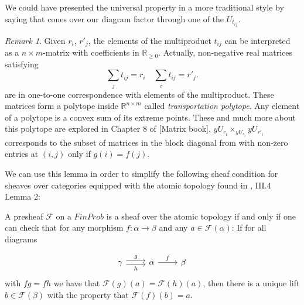 \documentclass[a4paper]{amsproc}
\theoremstyle{plain}
\theoremstyle{definition}
\theoremstyle{remark}
\newtheorem{remark}[theorem]{Remark}
\numberwithin{equation}{section}
\begin{document}
We could have presented the universal property in a more traditional style by saying that cones over our diagram factor through one of the $U_{t_{ij}}$.

\begin{remark} Given $r_i$, $r'_j$, the elements of the multiproduct $t_{ij}$ can be interpreted as a $n\times m$-matrix with coefficients in $\mathbb{R}_{\geq 0}$. Actually, non-negative real matrices satisfying
\[
\sum_j t_{ij} = r_i \quad \sum_i t_{ij} = r'_j .
\]
are in one-to-one correspondence with elements of the multiproduct. These matrices form a polytope inside $\mathbb{R}^{n\times m}$ called \emph{transportation polytope}. Any element of a polytope is a convex sum of its extreme points. These and much more about this polytope are explored in Chapter 8 of [Matrix book]. \newline
\indent $yU_{r_i}\times_{yU_{s_i}}yU_{r'_i}$ corresponds to the subset of matrices in the block diagonal from with non-zero entries at $(i,j)$ only if $g(i)=f(j)$.
\end{remark}
We can use this lemma in order to simplify the following sheaf condition for sheaves over categories equipped with the atomic topology found in \cite{sheaves_geometry_logic}, III.4 Lemma 2:

A presheaf $\mathcal{F}$ on a $FinProb$ is a sheaf over the atomic topology if and only if one can check that for any morphism $f: \alpha \to \beta$ and any $a \in \mathcal{F}(\alpha)$: If for all diagrams

\[
\begin{tikzcd}
\gamma \arrow[r, "g", shift left] \arrow[r, "h"', shift right] & \alpha \arrow[r, "f"] & \beta
\end{tikzcd}
\]
with $f g = f h$ we have that $\mathcal{F}(g)(a) = \mathcal{F}(h)(a)$, then there is a unique lift $b \in \mathcal{F}(\beta)$ with the property that $\mathcal{F}(f)(b) = a$.
\end{document}
